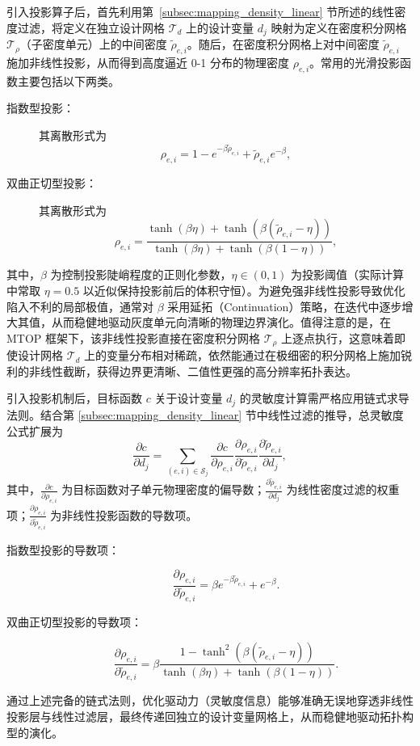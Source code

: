 引入投影算子后，首先利用第~\ref{subsec:mapping_density_linear} 节所述的线性密度过滤，将定义在独立设计网格 $\mathcal{T}_d$ 上的设计变量 $d_{j}$ 映射为定义在密度积分网格 $\mathcal{T}_{\rho}$（子密度单元）上的中间密度 $\tilde{\rho}_{e,i}$。随后，在密度积分网格上对中间密度 $\tilde{\rho}_{e,i}$ 施加非线性投影，从而得到高度逼近 0-1 分布的物理密度 $\rho_{e,i}$。常用的光滑投影函数主要包括以下两类。
\begin{description}
	\item[指数型投影：]其离散形式为
	\[
	\rho_{e,i} = 1 - e^{-\beta\tilde{\rho}_{e,i}} + \tilde{\rho}_{e,i}e^{-\beta},
	\]
	
	\item[双曲正切型投影：]其离散形式为
	\[
	\rho_{e,i} = \frac{\tanh(\beta\eta) + \tanh(\beta(\tilde{\rho}_{e,i} - \eta))}{\tanh(\beta\eta) + \tanh(\beta(1 - \eta))},
	\]
\end{description}
其中，$\beta$ 为控制投影陡峭程度的正则化参数，$\eta\in(0,1)$ 为投影阈值（实际计算中常取 $\eta=0.5$ 以近似保持投影前后的体积守恒）。为避免强非线性投影导致优化陷入不利的局部极值，通常对 $\beta$ 采用延拓（Continuation）策略，在迭代中逐步增大其值，从而稳健地驱动灰度单元向清晰的物理边界演化。值得注意的是，在 MTOP 框架下，该非线性投影直接在密度积分网格 $\mathcal{T}_{\rho}$ 上逐点执行，这意味着即使设计网格 $\mathcal{T}_d$ 上的变量分布相对稀疏，依然能通过在极细密的积分网格上施加锐利的非线性截断，获得边界更清晰、二值性更强的高分辨率拓扑表达。

引入投影机制后，目标函数 $c$ 关于设计变量 $d_j$ 的灵敏度计算需严格应用链式求导法则。结合第 \ref{subsec:mapping_density_linear} 节中线性过滤的推导，总灵敏度公式扩展为
\[
\frac{\partial c}{\partial d_j} = \sum_{(e,i) \in \mathcal{S}_j} \frac{\partial c}{\partial \rho_{e,i}} \frac{\partial \rho_{e,i}}{\partial \tilde{\rho}_{e,i}} \frac{\partial \tilde{\rho}_{e,i}}{\partial d_j},
\]
其中，$\frac{\partial c}{\partial \rho_{e,i}}$ 为目标函数对子单元物理密度的偏导数；$\frac{\partial \tilde{\rho}_{e,i}}{\partial d_j}$ 为线性密度过滤的权重项；$\frac{\partial \rho_{e,i}}{\partial \tilde{\rho}_{e,i}}$ 为非线性投影函数的导数项。

\begin{description}
	\item[指数型投影的导数项：]
	\[
	\frac{\partial \rho_{e,i}}{\partial \tilde{\rho}_{e,i}} = \beta e^{-\beta\tilde{\rho}_{e,i}} + e^{-\beta}.
	\]
	
	\item[双曲正切型投影的导数项：]
	\[
	\frac{\partial \rho_{e,i}}{\partial \tilde{\rho}_{e,i}} = \beta \frac{1 - \tanh^2(\beta(\tilde{\rho}_{e,i} - \eta))}{\tanh(\beta\eta) + \tanh(\beta(1 - \eta))}.
	\]
\end{description}
通过上述完备的链式法则，优化驱动力（灵敏度信息）能够准确无误地穿透非线性投影层与线性过滤层，最终传递回独立的设计变量网格上，从而稳健地驱动拓扑构型的演化。


